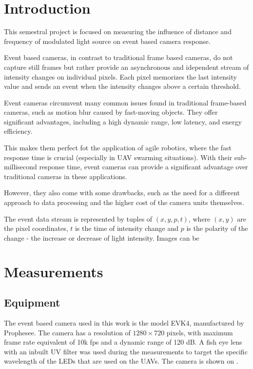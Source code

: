 
\chapter{Introduction\label{chap:introduction}}

This semestral project is focused on measuring the influence of distance and frequency of modulated
light source on event based camera response.

Event based cameras, in contrast to traditional frame based cameras, do not capture still frames but rather
provide an asynchronous and idependent stream of intensity changes on individual pixels.
Each pixel memorizes the last intensity value and sends an event when the intensity changes above a certain threshold.  \cite{gallego2020event}

Event cameras circumvent many common issues found in traditional frame-based cameras, such as motion blur caused
by fast-moving objects. They offer significant advantages, including a high dynamic range, low latency,
and energy efficiency.

This makes them perfect fot the application of agile robotics,
where the fast response time is crucial (especially in \ac{UAV} swarming situations). With their sub-millisecond response time,
event cameras can provide a significant advantage over traditional cameras in these applications. \cite{gallego2020event}

However, they also come with some drawbacks, such as the need for a different approach to
data processing and the higher cost of the camera units themselves.

The event data stream is represented by tuples of $(x, y, p, t)$, where $(x, y)$ are the pixel coordinates, $t$ is the time of
intensity change and $p$ is the polarity of the change - the increase or decrease of light intensity. Images can be 

\chapter{Measurements\label{chap:measurements}}

\section{Equipment}

The event based camera used in this work is the model EVK4, manufactured by Prophesee. The camera has a resolution of 
$1280 \times 720$ pixels, with maximum frame rate equivalent of 10k fps and a dynamic range of 120 dB.
A fish eye lens with an inbuilt UV filter was used during the measurements to target the specific wavelength of the LEDs
that are used on the UAVs. The camera is shown on . 

